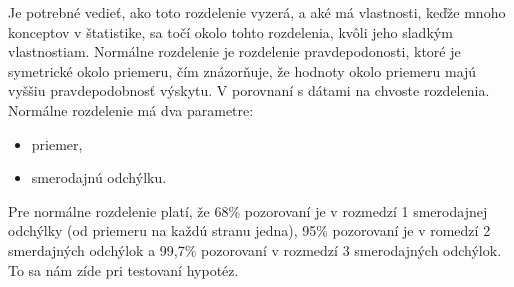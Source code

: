 Je potrebné vedieť, ako toto rozdelenie vyzerá, a aké má vlastnosti,
keďže mnoho konceptov v štatistike, sa točí okolo tohto rozdelenia,
kvôli jeho sladkým vlastnostiam. Normálne rozdelenie je rozdelenie
pravdepodonosti, ktoré je symetrické okolo priemeru, čím znázorňuje, že
hodnoty okolo priemeru majú vyššiu pravdepodobnosť výskytu. V porovnaní
s dátami na chvoste rozdelenia. Normálne rozdelenie má dva parametre:

\begin{itemize}
\tightlist
\item
  priemer,
\item
  smerodajnú odchýlku.
\end{itemize}

Pre normálne rozdelenie platí, že 68\% pozorovaní je v rozmedzí 1
smerodajnej odchýlky (od priemeru na každú stranu jedna), 95\%
pozorovaní je v romedzí 2 smerdajných odchýlok a 99,7\% pozorovaní v
rozmedzí 3 smerodajných odchýlok. To sa nám zíde pri testovaní hypotéz.

\begin{Shaded}
\begin{Highlighting}[]

\StringTok{  }\NormalTok{(} \NormalTok{, } \NormalTok{, } \NormalTok{)}


\NormalTok{(}\NormalTok{(}\NormalTok{, }\NormalTok{)) }


 \NormalTok{, } \NormalTok{)}

 \NormalTok{, } \NormalTok{)}
\end{Highlighting}
\end{Shaded}

